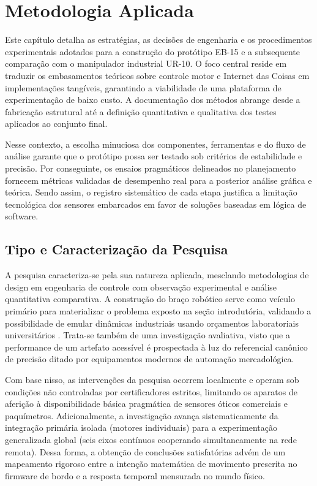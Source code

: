 \chapter{Metodologia Aplicada}

Este capítulo detalha as estratégias, as decisões de engenharia e os procedimentos experimentais adotados para a construção do protótipo EB-15 e a subsequente comparação com o manipulador industrial UR-10. O foco central reside em traduzir os embasamentos teóricos sobre controle motor e Internet das Coisas em implementações tangíveis, garantindo a viabilidade de uma plataforma de experimentação de baixo custo. A documentação dos métodos abrange desde a fabricação estrutural até a definição quantitativa e qualitativa dos testes aplicados ao conjunto final. 

Nesse contexto, a escolha minuciosa dos componentes, ferramentas e do fluxo de análise garante que o protótipo possa ser testado sob critérios de estabilidade e precisão. Por conseguinte, os ensaios pragmáticos delineados no planejamento fornecem métricas validadas de desempenho real para a posterior análise gráfica e teórica. Sendo assim, o registro sistemático de cada etapa justifica a limitação tecnológica dos sensores embarcados em favor de soluções baseadas em lógica de software.

\section{Tipo e Caracterização da Pesquisa}

A pesquisa caracteriza-se pela sua natureza aplicada, mesclando metodologias de design em engenharia de controle com observação experimental e análise quantitativa comparativa. A construção do braço robótico serve como veículo primário para materializar o problema exposto na seção introdutória, validando a possibilidade de emular dinâmicas industriais usando orçamentos laboratoriais universitários \cite{siciliano2009}. Trata-se também de uma investigação avaliativa, visto que a performance de um artefato acessível é prospectada à luz do referencial canônico de precisão ditado por equipamentos modernos de automação mercadológica.

Com base nisso, as intervenções da pesquisa ocorrem localmente e operam sob condições não controladas por certificadores estritos, limitando os aparatos de aferição à disponibilidade básica pragmática de sensores óticos comerciais e paquímetros. Adicionalmente, a investigação avança sistematicamente da integração primária isolada (motores individuais) para a experimentação generalizada global (seis eixos contínuos cooperando simultaneamente na rede remota). Dessa forma, a obtenção de conclusões satisfatórias advém de um mapeamento rigoroso entre a intenção matemática de movimento prescrita no firmware de bordo e a resposta temporal mensurada no mundo físico.

